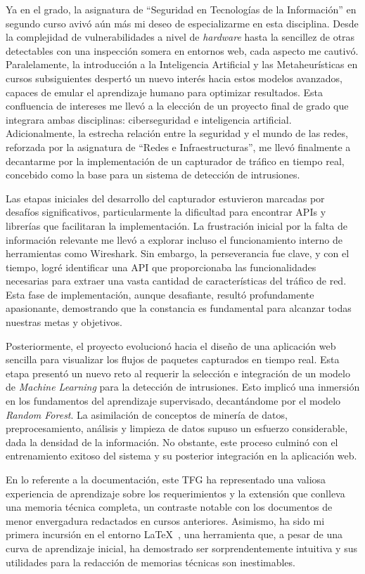 Ya en el grado, la asignatura de ``Seguridad en Tecnologías de la Información'' en segundo curso avivó aún más mi deseo de especializarme en esta disciplina. Desde la complejidad de vulnerabilidades a nivel de \textit{hardware} hasta la sencillez de otras detectables con una inspección somera en entornos web, cada aspecto me cautivó. Paralelamente, la introducción a la Inteligencia Artificial y las Metaheurísticas en cursos subsiguientes despertó un nuevo interés hacia estos modelos avanzados, capaces de emular el aprendizaje humano para optimizar resultados. Esta confluencia de intereses me llevó a la elección de un proyecto final de grado que integrara ambas disciplinas: ciberseguridad e inteligencia artificial. Adicionalmente, la estrecha relación entre la seguridad y el mundo de las redes, reforzada por la asignatura de ``Redes e Infraestructuras'', me llevó finalmente a decantarme por la implementación de un capturador de tráfico en tiempo real, concebido como la base para un sistema de detección de intrusiones.

Las etapas iniciales del desarrollo del capturador estuvieron marcadas por desafíos significativos, particularmente la dificultad para encontrar APIs y librerías que facilitaran la implementación. La frustración inicial por la falta de información relevante me llevó a explorar incluso el funcionamiento interno de herramientas como Wireshark. Sin embargo, la perseverancia fue clave, y con el tiempo, logré identificar una API que proporcionaba las funcionalidades necesarias para extraer una vasta cantidad de características del tráfico de red. Esta fase de implementación, aunque desafiante, resultó profundamente apasionante, demostrando que la constancia es fundamental para alcanzar todas nuestras metas y objetivos.

Posteriormente, el proyecto evolucionó hacia el diseño de una aplicación web sencilla para visualizar los flujos de paquetes capturados en tiempo real. Esta etapa presentó un nuevo reto al requerir la selección e integración de un modelo de \textit{Machine Learning} para la detección de intrusiones. Esto implicó una inmersión en los fundamentos del aprendizaje supervisado, decantándome por el modelo \textit{Random Forest}. La asimilación de conceptos de minería de datos, preprocesamiento, análisis y limpieza de datos supuso un esfuerzo considerable, dada la densidad de la información. No obstante, este proceso culminó con el entrenamiento exitoso del sistema y su posterior integración en la aplicación web.

En lo referente a la documentación, este TFG ha representado una valiosa experiencia de aprendizaje sobre los requerimientos y la extensión que conlleva una memoria técnica completa, un contraste notable con los documentos de menor envergadura redactados en cursos anteriores. Asimismo, ha sido mi primera incursión en el entorno \LaTeX~, una herramienta que, a pesar de una curva de aprendizaje inicial, ha demostrado ser sorprendentemente intuitiva y sus utilidades para la redacción de memorias técnicas son inestimables.

